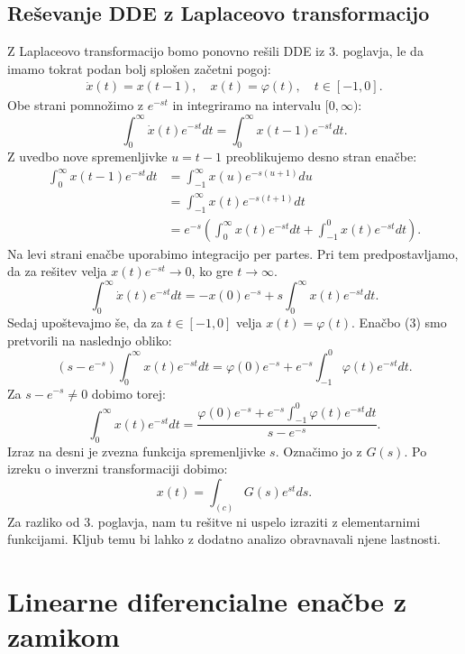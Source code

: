 \documentclass[12pt,a4paper]{amsart}
\theoremstyle{definition} %
\theoremstyle{plain} %
\begin{document}
\subsection{Reševanje DDE z Laplaceovo transformacijo}
    Z Laplaceovo transformacijo bomo ponovno rešili DDE iz 3. poglavja, le da imamo tokrat
    podan bolj splošen začetni pogoj:
    \begin{equation} \label{eq3}
        \begin{split}
            \dot{x}(t)=x(t-1), \quad x(t)=\varphi(t), \quad t\in[-1,0].
        \end{split}
    \end{equation}
    Obe strani pomnožimo z $e^{-st}$ in integriramo na intervalu $[0,\infty)$:
     \[\int_{0}^{\infty}\dot{x}(t)e^{-st}dt = \int_{0}^{\infty}x(t-1)e^{-st}dt.\]
    Z uvedbo nove spremenljivke $u=t-1$ preoblikujemo desno stran enačbe:
    \begin{equation*}
        \begin{split}
            \int_{0}^{\infty}x(t-1)e^{-st}dt &= \int_{-1}^{\infty}x(u)e^{-s(u+1)}du \\
             &= \int_{-1}^{\infty}x(t)e^{-s(t+1)}dt \\
             &= e^{-s}\left(\int_{0}^{\infty}x(t)e^{-st}dt + \int_{-1}^{0}x(t)e^{-st}dt\right). 
        \end{split}      
    \end{equation*}
    Na levi strani enačbe uporabimo integracijo per partes. Pri tem predpostavljamo, da za 
    rešitev velja $x(t)e^{-st} \to 0$, ko gre $t \to\infty$.
    \[\int_{0}^{\infty}\dot{x}(t)e^{-st}dt=-x(0)e^{-s}+s\int_{0}^{\infty}x(t)e^{-st}dt.\]
    Sedaj upoštevajmo še, da za $t\in[-1,0]$ velja $x(t)=\varphi(t)$. Enačbo (3) smo pretvorili na naslednjo obliko:
    \[(s-e^{-s})\int_{0}^{\infty}x(t)e^{-st}dt=\varphi(0)e^{-s}+e^{-s}\int_{-1}^0\varphi(t)e^{-st}dt.\]
    Za $s-e^{-s}\neq 0$ dobimo torej:
    \[\int_{0}^{\infty}x(t)e^{-st}dt=\frac{\varphi(0)e^{-s}+e^{-s}\int_{-1}^0\varphi(t)e^{-st}dt}{s-e^{-s}}.\]
    Izraz na desni je zvezna funkcija spremenljivke $s$. Označimo jo z $G(s)$. Po izreku o inverzni
    transformaciji dobimo:
    \[x(t)=\int_{(c)}G(s)e^{st}ds.\]
    Za razliko od 3. poglavja, nam tu rešitve ni uspelo
    izraziti z elementarnimi funkcijami. Kljub temu bi lahko z dodatno analizo obravnavali njene lastnosti.

\section{Linearne diferencialne enačbe z zamikom}
\end{document}
